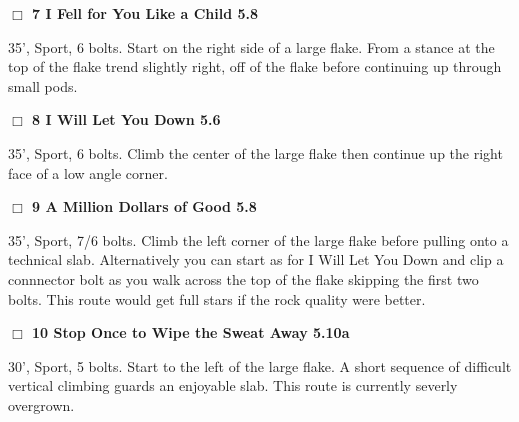 \begin{multicols}{2}
\needspace{2em}
\label{rt:I Fell for You Like a Child}
\colorbox{green!20}{
\parbox{0.95\linewidth}{
\hspace{-1ex}\textbf{$\Box$
7 I Fell for You Like a Child 5.8  
}}}
\begin{adjustwidth}{1.3em}{}			

35', Sport, 6 bolts. Start on the right side of a large flake. From a stance at the top of the flake trend slightly right, off of the flake before continuing up through small pods.
\end{adjustwidth}




\needspace{2em}
\label{rt:I Will Let You Down}
\colorbox{green!20}{
\parbox{0.95\linewidth}{
\hspace{-1ex}\textbf{$\Box$
8 I Will Let You Down 5.6  
}}}
\begin{adjustwidth}{1.3em}{}			

35', Sport, 6 bolts. Climb the center of the large flake then continue up the right face of a low angle corner.
\end{adjustwidth}




\needspace{2em}
\label{rt:A Million Dollars of Good}
\colorbox{green!20}{
\parbox{0.95\linewidth}{
\hspace{-1ex}\textbf{$\Box$
9 A Million Dollars of Good 5.8  
}}}
\begin{adjustwidth}{1.3em}{}			

35', Sport, 7/6 bolts. Climb the left corner of the large flake before pulling onto a technical slab. Alternatively you can start as for I Will Let You Down and clip a connnector bolt as you walk across the top of the flake skipping the first two bolts. This route would get full stars if the rock quality were better.
\end{adjustwidth}




\needspace{2em}
\label{rt:Stop Once to Wipe the Sweat Away}
\colorbox{RoyalBlue!20}{
\parbox{0.95\linewidth}{
\hspace{-1ex}\textbf{$\Box$
10 Stop Once to Wipe the Sweat Away 5.10a  
}}}
\begin{adjustwidth}{1.3em}{}			

30', Sport, 5 bolts. Start to the left of the large flake. A short sequence of difficult vertical climbing guards an enjoyable slab. This route is currently severly overgrown.
\end{adjustwidth}






\end{multicols}
\clearpage
